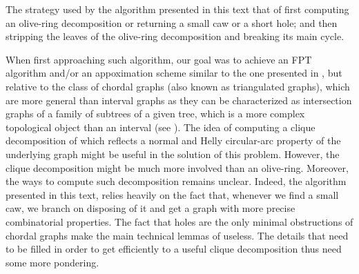 \documentclass{article}
\theoremstyle{definition}
\begin{document}
    The strategy used by
    the algorithm presented in
    this text that of first
    computing an olive-ring
    decomposition or returning
    a small caw or a short hole;
    and then
    stripping the leaves
    of the olive-ring decomposition
    and breaking its main cycle.

    When first approaching
    such algorithm, our
    goal was to achieve
    an FPT algorithm and/or an appoximation 
    scheme similar
    to the one presented in \cite{main},
    but relative to the 
    class of chordal graphs
    (also known as triangulated graphs),
    which are more general than
    interval graphs as they
    can be characterized as
    intersection graphs of 
    a family of subtrees of a given tree,
    which is a more complex
    topological object than
    an interval (see \cite{book}).
    The idea of computing
    a clique decomposition
    of which
    reflects a
    normal and Helly circular-arc
    property of the underlying
    graph might be
    useful in the solution
    of this problem.
    However, the clique
    decomposition
    might be much more
    involved than an olive-ring.
    Moreover, the ways
    to compute such decomposition
    remains unclear. 
    Indeed, the algorithm
    presented in this
    text, relies heavily
    on the fact that,
    whenever we find a small
    caw, we branch on
    disposing of it
    and get a graph
    with more precise
    combinatorial properties.
    The fact that holes
    are the only minimal
    obstructions of
    chordal graphs
    make the main
    technical lemmas
    of \cite{main}
    useless. The details
    that need to be filled
    in order to get
    efficiently to 
    a useful clique
    decomposition thus need
    some more pondering.

    \printbibliography
\end{document}
